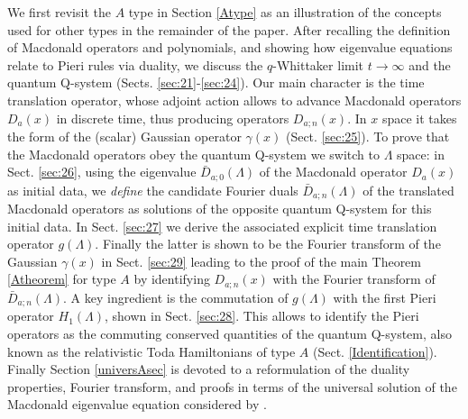 \documentclass[12pt]{amsart}
\newcommand{\lL}{{\Lambda}}
\numberwithin{equation}{section}
\begin{document}
We first revisit the $A$ type in Section \ref{Atype} as an illustration of the concepts used for other types in the remainder of the paper. 
After recalling the definition of Macdonald operators and polynomials, and showing how eigenvalue equations relate to Pieri rules via duality, we discuss the $q$-Whittaker limit $t\to\infty$ and the quantum Q-system (Sects. \ref{sec:21}-\ref{sec:24}).
Our main character is the time translation operator, whose adjoint action allows to advance Macdonald operators $D_a(x)$ in discrete time, thus producing operators $D_{a;n}(x)$. In $x$ space it takes the form of the (scalar) Gaussian operator $\gamma(x)$ (Sect. \ref{sec:25}). To prove that the Macdonald operators obey the quantum Q-system we switch to $\lL$ space: in Sect. \ref{sec:26}, using the eigenvalue $\bar D_{a;0}(\lL)$ of the Macdonald operator $D_a(x)$ as initial data, we {\it define} the candidate Fourier duals 
$\bar D_{a;n}(\lL)$ of the translated Macdonald operators as solutions of the opposite quantum Q-system for this initial data. In Sect. \ref{sec:27} we derive the associated explicit time translation operator $g(\lL)$.
Finally the latter is shown to be the Fourier transform of the Gaussian $\gamma(x)$ 
in Sect. \ref{sec:29} leading to the proof of the main Theorem \ref{Atheorem} for type $A$ by identifying $D_{a;n}(x)$ with the Fourier transform of $\bar D_{a;n}(\lL)$.
A key ingredient is the commutation of $g(\lL)$ with the first Pieri operator $H_1(\lL)$, 
shown in Sect. \ref{sec:28}. This allows to identify the Pieri operators as the commuting conserved 
quantities of the quantum Q-system, also known as the relativistic Toda Hamiltonians of type $A$ 
(Sect. \ref{Identification}). Finally Section \ref{universAsec} is devoted to a reformulation of the duality
properties, Fourier transform, and proofs in terms of the universal solution of the Macdonald eigenvalue equation considered by \cite{ShiraishiNoumi}. 
\end{document}

